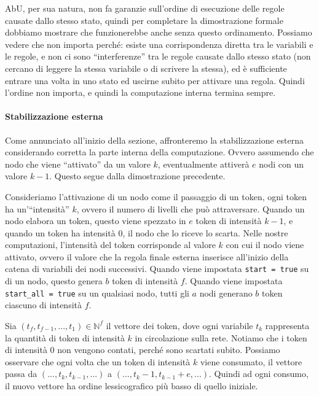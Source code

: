 \documentclass[12pt, a4paper]{article}
\begin{document}
AbU, per sua natura, non fa garanzie sull'ordine di esecuzione delle regole causate dallo stesso stato, quindi per completare la dimostrazione formale dobbiamo mostrare che funzionerebbe anche senza questo ordinamento.
Possiamo vedere che non importa perché: esiste una corrispondenza diretta tra le variabili e le regole, e non ci sono ``interferenze'' tra le regole causate dallo stesso stato (non cercano di leggere la stessa variabile o di scrivere la stessa), ed è sufficiente entrare una volta in uno stato ed uscirne subito per attivare una regola.
Quindi l'ordine non importa, e quindi la computazione interna termina sempre.

\paragraph{Stabilizzazione esterna}

Come annunciato all'inizio della sezione, affronteremo la stabilizzazione esterna considerando corretta la parte interna della computazione. Ovvero assumendo che nodo che viene ``attivato'' da un valore $k$, eventualmente attiverà $e$ nodi con un valore $k-1$. Questo segue dalla dimostrazione precedente.

Consideriamo l'attivazione di un nodo come il passaggio di un token, ogni token ha un'``intensità'' $k$, ovvero il numero di livelli che può attraversare. Quando un nodo elabora un token, questo viene spezzato in $e$ token di intensità $k-1$, e quando un token ha intensità $0$, il nodo che lo riceve lo scarta.
Nelle nostre computazioni, l'intensità del token corrisponde al valore $k$ con cui il nodo viene attivato, ovvero il valore che la regola finale esterna inserisce all'inizio della catena di variabili dei nodi successivi. Quando viene impostata \lstinline{start = true} su di un nodo, questo genera $b$ token di intensità $f$. Quando viene impostata \lstinline{start_all = true} su un qualsiasi nodo, tutti gli $a$ nodi generano $b$ token ciascuno di intensità $f$.

Sia $(t_f,t_{f-1},...,t_1)\in\mathbb{N}^f$ il vettore dei token, dove ogni variabile $t_k$ rappresenta la quantità di token di intensità $k$ in circolazione sulla rete. Notiamo che i token di intensità $0$ non vengono contati, perché sono scartati subito.
Possiamo osservare che ogni volta che un token di intensità $k$ viene consumato, il vettore passa da $(...,t_k,t_{k-1},...)$ a $(...,t_k-1,t_{k-1}+e,...)$. Quindi ad ogni consumo, il nuovo vettore ha ordine lessicografico più basso di quello iniziale.
\end{document}
